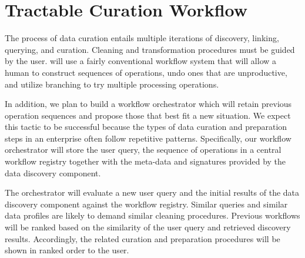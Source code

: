 \section{Tractable Curation Workflow}
\label{sec:workflow}

The process of data curation entails multiple iterations of discovery, linking, querying, and curation. Cleaning and
transformation procedures must be guided by the user. \dcv will use a fairly
conventional workflow system that will allow a human to construct sequences of
operations, undo ones that are unproductive, and utilize branching to try
multiple processing operations.


In addition, we plan to build a workflow orchestrator which will retain previous
operation sequences and propose those that best fit a new situation. We
expect this tactic to be successful because the types of data curation and
preparation steps in an enterprise often follow repetitive patterns.
Specifically, our workflow orchestrator will store the user query, the sequence
of operations in a central workflow registry together with the meta-data and
signatures provided by the data discovery component. 


The orchestrator will evaluate a new user query and the initial results of
the data discovery component against the workflow registry. Similar queries and
similar data profiles are likely to demand similar cleaning procedures. Previous
workflows will be ranked based on the similarity of the user query and retrieved
discovery results. Accordingly, the related curation and preparation procedures
will be shown in ranked order to the user.

